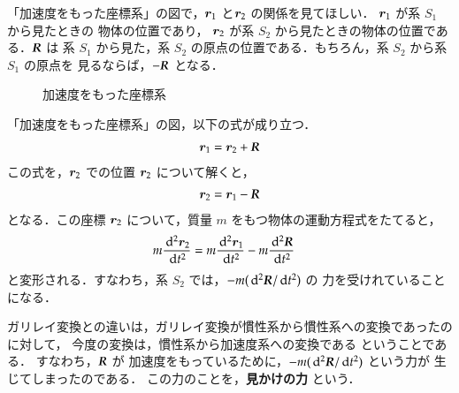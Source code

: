                 「加速度をもった座標系」の図で，$\boldsymbol{r}_{1}$ と$\boldsymbol{r}_{2}$ の関係を見てほしい．
                 $\boldsymbol{r}_{1}$ が系 $S_{1}$ から見たときの 物体の位置であり，
                 $\boldsymbol{r}_{2}$ が系 $S_{2}$ から見たときの物体の位置である．$\textit{\textbf{R}}$ は
                 系 $S_{1}$ から見た，系 $S_{2}$ の原点の位置である．もちろん，系 $S_{2}$ から系 $S_{1}$ の原点を
                 見るならば，$-\textit{\textbf{R}}$ となる．

                            \begin{figure}[htbp]
                                \begin{center}
                                    \caption{加速度をもった座標系}
                                    \label{fig:gari1}
                                \end{center}
                            \end{figure}

                「加速度をもった座標系」の図，以下の式が成り立つ．
                    \begin{align}
                        \boldsymbol{r}_{1}=\boldsymbol{r}_{2}+\textit{\textbf{R}}
                    \end{align}
                この式を，$\boldsymbol{r}_{2}$ での位置 $\boldsymbol{r}_{2}$ について解くと，
                    \begin{align}
                        \boldsymbol{r}_{2}=\boldsymbol{r}_{1}-\textit{\textbf{R}}
                    \end{align}
                となる．この座標 $\boldsymbol{r}_{2}$ について，質量 $m$ をもつ物体の運動方程式をたてると，
                    \begin{align}\label{kasokudo3}
                        m\frac{\df^{2}\br_{2}}{\df t^{2}}
                        &= m\frac{\df^{2}\br_{1}}{\df t^{2}}-m\frac{\df^{2}\textit{\textbf{R}}}{\df t^{2}}
                    \end{align}
                と変形される．すなわち，系 $S_{2}$ では，$-m(\,\mathrm{d}^{2}\textit{\textbf{R}}/\,\mathrm{d} t^{2})$ の
                力を受けれていることになる．

                ガリレイ変換との違いは，ガリレイ変換が慣性系から慣性系への変換であったのに対して，
                今度の変換は，慣性系から加速度系への変換である ということである．
                すなわち，$\textit{\textbf{R}}$ が
                加速度をもっているために，$-m(\,\mathrm{d}^{2}\textit{\textbf{R}}/\,\mathrm{d} t^{2})$ という力が
                生じてしまったのである．
                この力のことを，\textbf{見かけの力} という．

